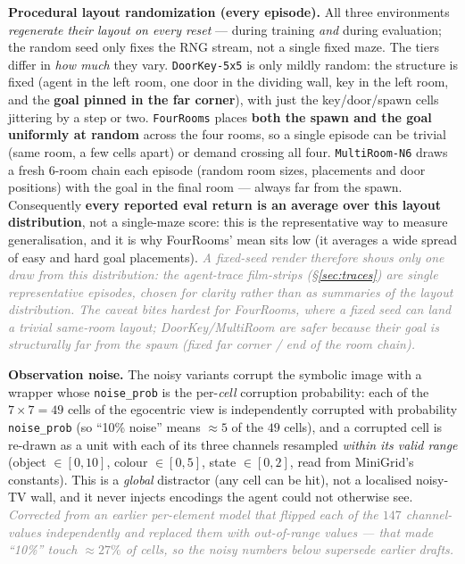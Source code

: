 \documentclass[11pt]{article}
\newcommand{\note}[1]{\textcolor{gray}{\small\emph{#1}}}
\begin{document}
\textbf{Procedural layout randomization (every episode).} All three environments
\emph{regenerate their layout on every reset} --- during training \emph{and} during evaluation; the
random seed only fixes the RNG stream, not a single fixed maze. The tiers differ in \emph{how much}
they vary. \texttt{DoorKey-5x5} is only mildly random: the structure is fixed (agent in the left
room, one door in the dividing wall, key in the left room, and the \textbf{goal pinned in the far
corner}), with just the key/door/spawn cells jittering by a step or two. \texttt{FourRooms} places
\textbf{both the spawn and the goal uniformly at random} across the four rooms, so a single episode can
be trivial (same room, a few cells apart) or demand crossing all four. \texttt{MultiRoom-N6} draws a
fresh $6$-room chain each episode (random room sizes, placements and door positions) with the goal in
the final room --- always far from the spawn. Consequently \textbf{every reported eval return is an
average over this layout distribution}, not a single-maze score: this is the representative way to
measure generalisation, and it is why FourRooms' mean sits low (it averages a wide spread of easy and
hard goal placements). \note{A fixed-seed render therefore shows only \emph{one} draw from this
distribution: the agent-trace film-strips (\S\ref{sec:traces}) are single representative episodes,
chosen for clarity rather than as summaries of the layout distribution. The caveat bites hardest for
FourRooms, where a fixed seed can land a trivial same-room layout; DoorKey/MultiRoom are safer because
their goal is \emph{structurally} far from the spawn (fixed far corner / end of the room chain).}

\textbf{Observation noise.} The noisy variants corrupt the symbolic image with a wrapper whose
\texttt{noise\_prob} is the per-\emph{cell} corruption probability: each of the $7\!\times\!7{=}49$ cells
of the egocentric view is independently corrupted with probability \texttt{noise\_prob} (so ``10\%
noise'' means $\approx5$ of the $49$ cells), and a corrupted cell is re-drawn as a unit with each of its
three channels resampled \emph{within its valid range} (object $\in[0,10]$, colour $\in[0,5]$, state
$\in[0,2]$, read from MiniGrid's constants). This is a \emph{global} distractor (any cell can be hit),
not a localised noisy-TV wall, and it never injects encodings the agent could not otherwise see.
\note{Corrected from an earlier per-\emph{element} model that flipped each of the $147$ channel-values
independently and replaced them with out-of-range values --- that made ``10\%'' touch $\approx27\%$ of
cells, so the noisy numbers below supersede earlier drafts.}
\end{document}
